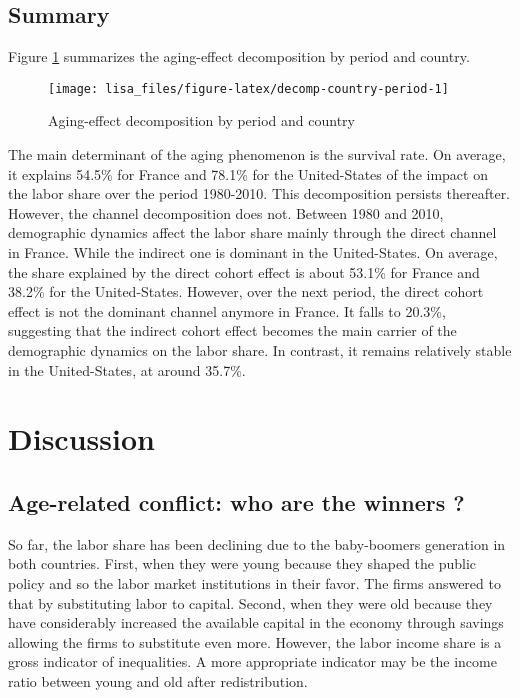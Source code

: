 \documentclass[
]{article}
\begin{document}
\hypertarget{summary}{%
\subsection{Summary}\label{summary}}

Figure \ref{fig:decomp-country-period} summarizes the aging-effect decomposition by period and country.

\begin{figure}[!tb]

{\centering \texttt{[image: lisa\_files/figure-latex/decomp-country-period-1]} 

}

\caption{Aging-effect decomposition by period and country}\label{fig:decomp-country-period}
\end{figure}

The main determinant of the aging phenomenon is the survival rate. On average, it explains 54.5\% for France and 78.1\% for the United-States of the impact on the labor share over the period 1980-2010. This decomposition persists thereafter. However, the channel decomposition does not. Between 1980 and 2010, demographic dynamics affect the labor share mainly through the direct channel in France. While the indirect one is dominant in the United-States. On average, the share explained by the direct cohort effect is about 53.1\% for France and 38.2\% for the United-States. However, over the next period, the direct cohort effect is not the dominant channel anymore in France. It falls to 20.3\%, suggesting that the indirect cohort effect becomes the main carrier of the demographic dynamics on the labor share. In contrast, it remains relatively stable in the United-States, at around 35.7\%.

\hypertarget{discussion}{%
\section{Discussion}\label{discussion}}

\hypertarget{winners}{%
\subsection{Age-related conflict: who are the winners ?}\label{winners}}

So far, the labor share has been declining due to the baby-boomers generation in both countries. First, when they were young because they shaped the public policy and so the labor market institutions in their favor. The firms answered to that by substituting labor to capital. Second, when they were old because they have considerably increased the available capital in the economy through savings allowing the firms to substitute even more. However, the labor income share is a gross indicator of inequalities. A more appropriate indicator may be the income ratio between young and old after redistribution.
\end{document}
